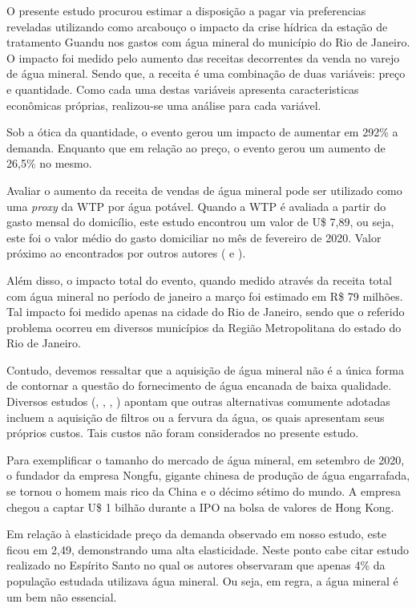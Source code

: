 \documentclass[
  12pt,
]{book}
\begin{document}
O presente estudo procurou estimar a disposição a pagar via preferencias reveladas utilizando como arcabouço o impacto da crise hídrica da estação de tratamento Guandu nos gastos com água mineral do município do Rio de Janeiro. O impacto foi medido pelo aumento das receitas decorrentes da venda no varejo de água mineral. Sendo que, a receita é uma combinação de duas variáveis: preço e quantidade. Como cada uma destas variáveis apresenta caracteristicas econômicas próprias, realizou-se uma análise para cada variável.

Sob a ótica da quantidade, o evento gerou um impacto de aumentar em 292\% a demanda. Enquanto que em relação ao preço, o evento gerou um aumento de 26,5\% no mesmo.

Avaliar o aumento da receita de vendas de água mineral pode ser utilizado como uma \emph{proxy} da WTP por água potável. Quando a WTP é avaliada a partir do gasto mensal do domicílio, este estudo encontrou um valor de U\$ 7,89, ou seja, este foi o valor médio do gasto domiciliar no mês de fevereiro de 2020. Valor próximo ao encontrados por outros autores (\citet{wtpmalawi} e \citet{wtpespiritosanto}).

Além disso, o impacto total do evento, quando medido através da receita total com água mineral no período de janeiro a março foi estimado em R\$ 79 milhões. Tal impacto foi medido apenas na cidade do Rio de Janeiro, sendo que o referido problema ocorreu em diversos municípios da Região Metropolitana do estado do Rio de Janeiro.

Contudo, devemos ressaltar que a aquisição de água mineral não é a única forma de contornar a questão do fornecimento de água encanada de baixa qualidade. Diversos estudos (\citet{migueldoria}, \citet{franzfoltz}, \citet{wtpespiritosanto}, \citet{serret}) apontam que outras alternativas comumente adotadas incluem a aquisição de filtros ou a fervura da água, os quais apresentam seus próprios custos. Tais custos não foram considerados no presente estudo.

Para exemplificar o tamanho do mercado de água mineral, em setembro de 2020, o fundador da empresa Nongfu, gigante chinesa de produção de água engarrafada, se tornou o homem mais rico da China e o décimo sétimo do mundo. A empresa chegou a captar U\$ 1 bilhão durante a IPO na bolsa de valores de Hong Kong.

Em relação à elasticidade preço da demanda observado em nosso estudo, este ficou em 2,49, demonstrando uma alta elasticidade. Neste ponto cabe citar estudo realizado no Espírito Santo \citep{wtpespiritosanto} no qual os autores observaram que apenas 4\% da população estudada utilizava água mineral. Ou seja, em regra, a água mineral é um bem não essencial.
\end{document}
